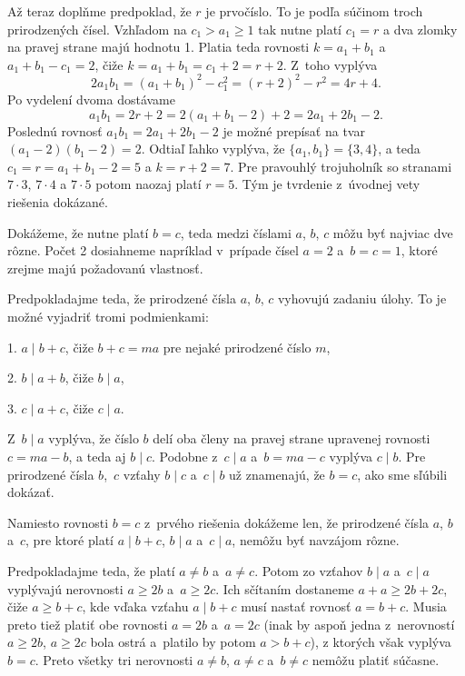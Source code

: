 {Až teraz doplňme predpoklad, že $r$ je prvočíslo.
To je podľa  súčinom troch prirodzených čísel. Vzhľadom na
$c_1>a_1\geq1$ tak nutne platí $c_1 = r$ a dva zlomky na pravej
strane  majú hodnotu 1.
Platia teda rovnosti $k=a_1+b_1$ a $a_1+b_1-c_1=2$, čiže $k=a_1+b_1=c_1+2=r+2$. Z~toho vyplýva
$$
2a_1b_1=(a_1+b_1)^2-c_1^2=(r+2)^2-r^2=4r+4.
$$
Po vydelení dvoma dostávame
$$
a_1b_1=2r+2=2(a_1+b_1-2)+2=2a_1+2b_1-2.
$$
Poslednú rovnosť $a_1b_1=2a_1+2b_1-2$ je možné prepísať na tvar
$(a_1-2)(b_1-2)=2$. Odtiaľ ľahko vyplýva, že $\{a_1,b_1\}=\{3,4\}$,
a teda $c_1=r=a_1+b_1-2=5$ a $k=r+2=7$. Pre pravouhlý trojuholník so
stranami $7\cdot3$, $7\cdot4$ a $7\cdot5$ potom naozaj platí
$r=5$. Tým je tvrdenie z~úvodnej vety riešenia dokázané.
}

{%
Dokážeme, že nutne platí $b=c$, teda medzi číslami $a$, $b$, $c$
môžu byť najviac dve rôzne. Počet 2 dosiahneme napríklad v~prípade
čísel $a=2$ a~$b=c=1$, ktoré zrejme majú požadovanú vlastnosť.

Predpokladajme teda, že prirodzené čísla $a$, $b$, $c$ vyhovujú
zadaniu úlohy. To je možné vyjadriť tromi podmienkami:

\smallskip
\item{1.} $a\mid b+c$, čiže $b+c=ma$ pre nejaké prirodzené číslo $m$,
\item{2.} $b\mid a+b$, čiže $b\mid a$,
\item{3.} $c\mid a+c$, čiže $c\mid a$.

\smallskip\noindent
Z~$b\mid a$ vyplýva, že číslo $b$ delí oba členy na pravej strane
upravenej rovnosti $c=ma-b$, a teda aj $b\mid c$.
Podobne z~$c\mid a$ a~$b=ma-c$ vyplýva $c\mid b$. Pre
prirodzené čísla $b$,~$c$ vzťahy $b\mid c$ a~$c\mid b$
už znamenajú, že $b=c$, ako sme sľúbili dokázať.

\ineriesenie
Namiesto rovnosti $b=c$ z~prvého riešenia
dokážeme len, že prirodzené čísla $a$, $b$ a~$c$, pre ktoré platí
$a\mid b+c$, $b\mid a$ a~$c\mid a$, nemôžu byť navzájom rôzne.

Predpokladajme teda, že platí $a\ne b$ a~$a\ne c$. Potom zo vzťahov
$b\mid a$ a~$c\mid a$ vyplývajú nerovnosti $a\geq 2b$ a~$a\geq 2c$.
Ich sčítaním dostaneme $a+a\geq 2b+2c$, čiže $a\geq b+c$, kde vďaka vzťahu
$a\mid b+c$ musí nastať rovnosť $a=b+c$. Musia preto tiež platiť
obe rovnosti $a=2b$ a~$a=2c$ (inak by aspoň jedna
z~nerovností $a\geq 2b$, $a\geq 2c$ bola ostrá a~platilo by potom $a>b+c$),
z ktorých však vyplýva $b=c$. Preto
všetky tri nerovnosti $a\ne b$, $a\ne c$ a~$b\ne c$ nemôžu
platiť súčasne.

}

